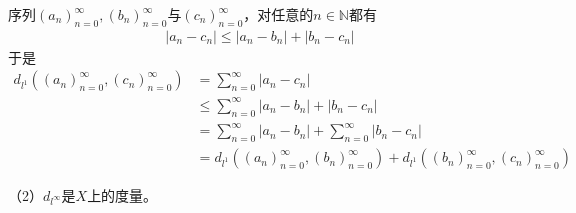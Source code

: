 \documentclass{article}
\begin{document}
\begin{itemize}
            序列$(a_n)_{n=0}^\infty,(b_n)_{n=0}^\infty$与$(c_n)_{n=0}^\infty$，对任意的$n \in \mathbb{N}$都有
            \begin{align*}
                  |a_n - c_n| \leq |a_n - b_n| + |b_n - c_n|
            \end{align*}
            于是
            \begin{align*}
                  d_{l^1}((a_n)_{n = 0}^\infty, (c_n)_{n = 0}^\infty) & = \sum \limits_{n = 0}^\infty |a_n - c_n|                                                                   \\
                                                                      & \leq \sum \limits_{n = 0}^\infty |a_n - b_n| + |b_n - c_n|                                                  \\
                                                                      & = \sum \limits_{n = 0}^\infty |a_n - b_n| + \sum \limits_{n = 0}^\infty |b_n - c_n|                         \\
                                                                      & = d_{l^1}((a_n)_{n = 0}^\infty, (b_n)_{n = 0}^\infty) + d_{l^1}((b_n)_{n = 0}^\infty, (c_n)_{n = 0}^\infty)
            \end{align*}

\end{itemize}

（2）$d_{l^\infty}$是$X$上的度量。
\end{document}
